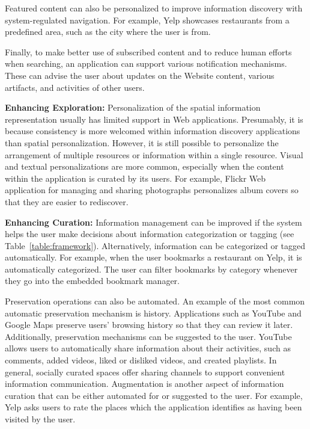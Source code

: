 \documentclass{sigchi}
\newcommand{\feature}[1]{{\ttfamily#1}}
\begin{document}
{{{Featured content can also be \feature{personalized} to improve information discovery with system-regulated navigation. For example, Yelp showcases restaurants from a predefined area, such as the city where the user is from.

Finally, to make better use of subscribed content and to reduce human efforts when searching, an application can support various \feature{notification mechanisms}. These can advise the user about updates on the \feature{Website content}, various \feature{artifacts}, and activities of other \feature{users}.  

} %
{\textbf{Enhancing Exploration:}
\feature{Personalization} of the \feature{spatial} information representation usually has limited support in Web applications. Presumably, it is because consistency is more welcomed within information discovery applications than spatial personalization. However, it is still possible to personalize the arrangement of multiple resources or information within a single resource. 
%
\feature{Visual} and \feature{textual personalizations} are more common, especially when the content within the application is curated by its users.  For example, Flickr Web application for managing and sharing photographs personalizes album covers so that they are easier to rediscover. 


{\textbf{Enhancing Curation:}
Information management can be improved if the system helps the user make decisions about information categorization or tagging (see Table~\ref{table:framework}). Alternatively, information can be \feature{categorized} or \feature{tagged automatically}. For example, when the user bookmarks a restaurant on Yelp, it is automatically categorized. The user can filter bookmarks by category whenever they go into the embedded bookmark manager. 

Preservation operations can also be automated. An example of the most common automatic preservation mechanism is \feature{history}. Applications such as YouTube and Google Maps preserve users' browsing history so that they can review it later. Additionally, preservation mechanisms can be \feature{suggested} to the user.
% 
YouTube allows users to \feature{automatically share} information about their activities, such as comments,  added videos, liked or disliked videos, and created playlists. In general, socially curated spaces \feature{offer sharing channels} to support convenient information communication.
%
Augmentation is another aspect of information curation that can be either \feature{automated} for or \feature{suggested} to the user. For example, Yelp asks users to rate the places which the application identifies as having been visited by the user. 

}}}}
\end{document}
